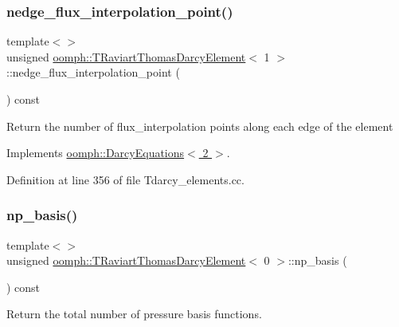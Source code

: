 \subsubsection{\texorpdfstring{nedge\+\_\+flux\+\_\+interpolation\+\_\+point()}{nedge\_flux\_interpolation\_point()}\hspace{0.1cm}{\footnotesize\ttfamily [3/3]}}
{\footnotesize\ttfamily template$<$$>$ \\
unsigned \hyperlink{classoomph_1_1TRaviartThomasDarcyElement}{oomph\+::\+T\+Raviart\+Thomas\+Darcy\+Element}$<$ 1 $>$\+::nedge\+\_\+flux\+\_\+interpolation\+\_\+point (\begin{DoxyParamCaption}{ }\end{DoxyParamCaption}) const\hspace{0.3cm}{\ttfamily [virtual]}}

Return the number of flux\+\_\+interpolation points along each edge of the element 

Implements \hyperlink{classoomph_1_1DarcyEquations_a4e09bc2cc0d08dc6dd43580c2a45d5c4}{oomph\+::\+Darcy\+Equations$<$ 2 $>$}.



Definition at line 356 of file Tdarcy\+\_\+elements.\+cc.

\mbox{\label{classoomph_1_1TRaviartThomasDarcyElement_a89bd2a644fa5e3bd9317c98ae8ab1638}} 
\subsubsection{\texorpdfstring{np\+\_\+basis()}{np\_basis()}\hspace{0.1cm}{\footnotesize\ttfamily [1/3]}}
{\footnotesize\ttfamily template$<$$>$ \\
unsigned \hyperlink{classoomph_1_1TRaviartThomasDarcyElement}{oomph\+::\+T\+Raviart\+Thomas\+Darcy\+Element}$<$ 0 $>$\+::np\+\_\+basis (\begin{DoxyParamCaption}{ }\end{DoxyParamCaption}) const\hspace{0.3cm}{\ttfamily [virtual]}}



Return the total number of pressure basis functions. 




